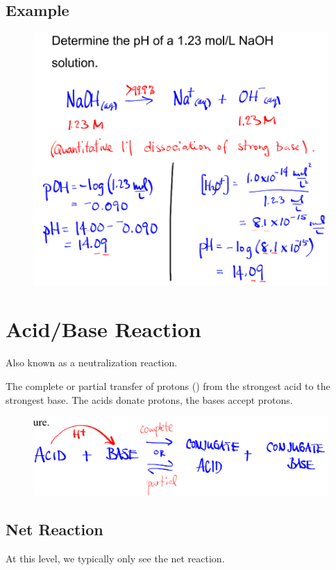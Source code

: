 \documentclass[a4paper,12pt]{article}
\begin{document}
\subsection{Example}
\begin{figure}[H]
    \includegraphics[width=\textwidth]{ph-example}
\end{figure}

\section{Acid/Base Reaction}
Also known as a neutralization reaction.

The complete or partial transfer of protons () from the strongest acid to the strongest base. The acids donate protons, the bases accept protons.

\normalsize
\begin{figure}[H]
    \includegraphics[width=\textwidth]{acidbase}
\end{figure}

\subsection{Net Reaction}
At this level, we typically only see the net reaction.
\end{document}
